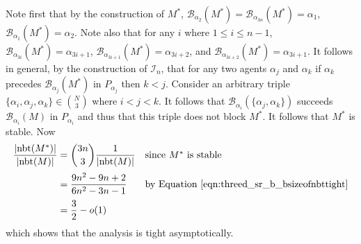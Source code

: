 Note first that by the construction of $M^*$, $\mathscr{B}_{\alpha_2}(M^*) = \mathscr{B}_{\alpha_{3n}}(M^*) = \alpha_1$, $\mathscr{B}_{\alpha_1}(M^*) = \alpha_2$. Note also that for any $i$ where $1 \leq i \leq n - 1$, $\mathscr{B}_{\alpha_{3i}}(M^*) = \alpha_{3i + 1}$, $\mathscr{B}_{\alpha_{3i + 1}}(M^*) = \alpha_{3i + 2}$, and $\mathscr{B}_{\alpha_{3i + 2}}(M^*) = \alpha_{3i + 1}$. It follows in general, by the construction of $\mathcal{I}_n$, that for any two agents $\alpha_j$ and $\alpha_k$ if $\alpha_k$ precedes $\mathscr{B}_{\alpha_j}(M^*)$ in $P_{\alpha_j}$ then $k < j$. Consider an arbitrary triple $\{ \alpha_i, \alpha_j, \alpha_k \} \in \binom{N}{3}$ where $i < j < k$. It follows that $\mathscr{B}_{\alpha_i}(\{ \alpha_j, \alpha_k \})$ succeeds $\mathscr{B}_{\alpha_i}(M)$ in $P_{\alpha_i}$ and thus that this triple does not block $M^*$. It follows that $M^*$ is stable. Now
\begingroup
\allowdisplaybreaks
\begin{align*}
    \frac{|\textrm{nbt}(M^*)|}{|\textrm{nbt}(M)|} &= \binom{3n}{3}\frac{1}{|\textrm{nbt}(M)|} && \mbox{since $M^*$ is stable}\\[0.2em]
    &= \frac{9n^2 - 9n + 2}{6n^2 - 3n - 1} && \mbox{by Equation~\ref{eqn:threed_sr_b_bsizeofnbttight}}\\[0.2em]
    &= \frac{3}{2} - o(1)
\end{align*}
\endgroup
which shows that the analysis is tight asymptotically.




